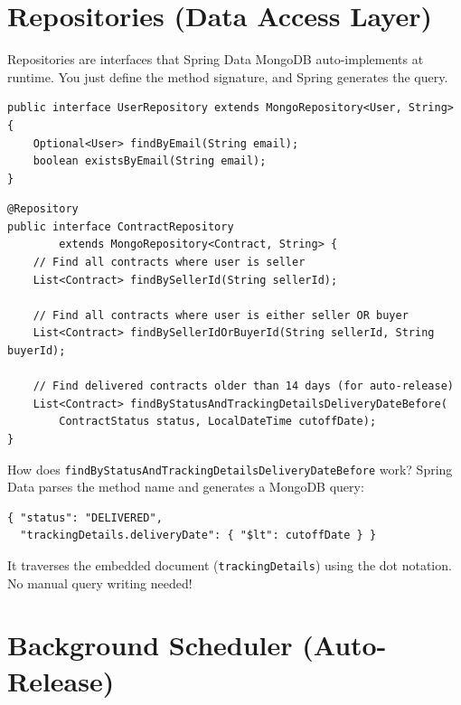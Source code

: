 \documentclass[11pt, a4paper]{article}
\begin{document}
\section{Repositories (Data Access Layer)}

Repositories are interfaces that Spring Data MongoDB auto-implements at runtime. You just define the method signature, and Spring generates the query.

\begin{lstlisting}[caption={UserRepository.java}]
public interface UserRepository extends MongoRepository<User, String> {
    Optional<User> findByEmail(String email);
    boolean existsByEmail(String email);
}
\end{lstlisting}

\begin{lstlisting}[caption={ContractRepository.java}]
@Repository
public interface ContractRepository
        extends MongoRepository<Contract, String> {
    // Find all contracts where user is seller
    List<Contract> findBySellerId(String sellerId);

    // Find all contracts where user is either seller OR buyer
    List<Contract> findBySellerIdOrBuyerId(String sellerId, String buyerId);

    // Find delivered contracts older than 14 days (for auto-release)
    List<Contract> findByStatusAndTrackingDetailsDeliveryDateBefore(
        ContractStatus status, LocalDateTime cutoffDate);
}
\end{lstlisting}

\begin{interviewbox}{How does \texttt{findByStatusAndTrackingDetailsDeliveryDateBefore} work?}
Spring Data parses the method name and generates a MongoDB query:
\begin{lstlisting}[style=yamlstyle]
{ "status": "DELIVERED",
  "trackingDetails.deliveryDate": { "$lt": cutoffDate } }
\end{lstlisting}
It traverses the embedded document (\texttt{trackingDetails}) using the dot notation. No manual query writing needed!
\end{interviewbox}


\section{Background Scheduler (Auto-Release)}
\end{document}
